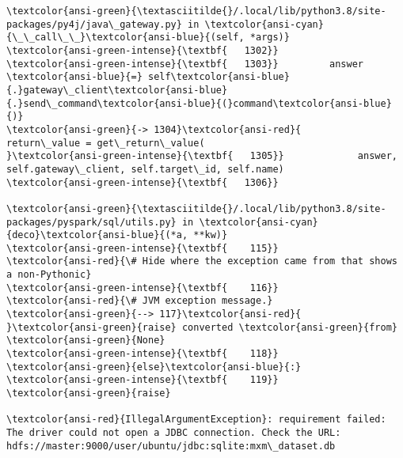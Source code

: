 \documentclass[11pt]{article}
\makeatletter
\newcommand{\boxspacing}{\kern\kvtcb@left@rule\kern\kvtcb@boxsep}
\newcommand{\prompt}[4]{
        {\ttfamily\llap{{\color{#2}[#3]:\hspace{3pt}#4}}\vspace{-\baselineskip}}
    }
\makeatother
\begin{document}
\begin{Verbatim}[commandchars=\\\{\}, frame=single, framerule=2mm, rulecolor=\color{outerrorbackground}]
\textcolor{ansi-green}{\textasciitilde{}/.local/lib/python3.8/site-packages/py4j/java\_gateway.py} in \textcolor{ansi-cyan}{\_\_call\_\_}\textcolor{ansi-blue}{(self, *args)}
\textcolor{ansi-green-intense}{\textbf{   1302}} 
\textcolor{ansi-green-intense}{\textbf{   1303}}         answer \textcolor{ansi-blue}{=} self\textcolor{ansi-blue}{.}gateway\_client\textcolor{ansi-blue}{.}send\_command\textcolor{ansi-blue}{(}command\textcolor{ansi-blue}{)}
\textcolor{ansi-green}{-> 1304}\textcolor{ansi-red}{         return\_value = get\_return\_value(
}\textcolor{ansi-green-intense}{\textbf{   1305}}             answer, self.gateway\_client, self.target\_id, self.name)
\textcolor{ansi-green-intense}{\textbf{   1306}} 

\textcolor{ansi-green}{\textasciitilde{}/.local/lib/python3.8/site-packages/pyspark/sql/utils.py} in \textcolor{ansi-cyan}{deco}\textcolor{ansi-blue}{(*a, **kw)}
\textcolor{ansi-green-intense}{\textbf{    115}}                 \textcolor{ansi-red}{\# Hide where the exception came from that shows a non-Pythonic}
\textcolor{ansi-green-intense}{\textbf{    116}}                 \textcolor{ansi-red}{\# JVM exception message.}
\textcolor{ansi-green}{--> 117}\textcolor{ansi-red}{                 }\textcolor{ansi-green}{raise} converted \textcolor{ansi-green}{from} \textcolor{ansi-green}{None}
\textcolor{ansi-green-intense}{\textbf{    118}}             \textcolor{ansi-green}{else}\textcolor{ansi-blue}{:}
\textcolor{ansi-green-intense}{\textbf{    119}}                 \textcolor{ansi-green}{raise}

\textcolor{ansi-red}{IllegalArgumentException}: requirement failed: The driver could not open a JDBC connection. Check the URL: hdfs://master:9000/user/ubuntu/jdbc:sqlite:mxm\_dataset.db
    \end{Verbatim}

    \begin{tcolorbox}[breakable, size=fbox, boxrule=1pt, pad at break*=1mm,colback=cellbackground, colframe=cellborder]
\prompt{In}{incolor}{ }{\boxspacing}
\begin{Verbatim}[commandchars=\\\{\}]

\end{Verbatim}
\end{tcolorbox}


    
    
    
\end{document}
